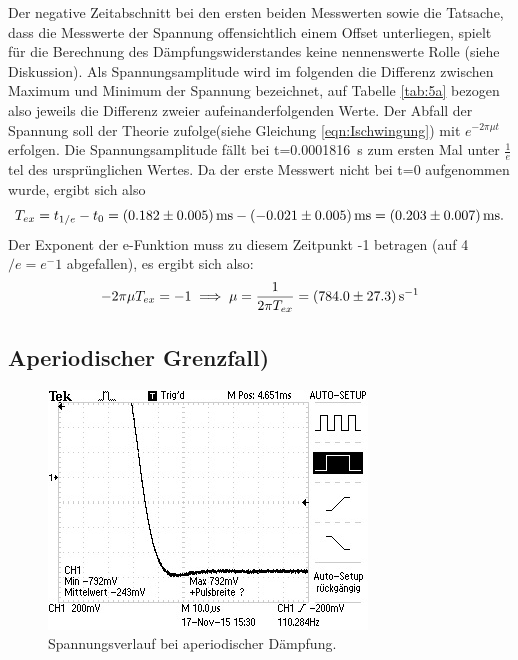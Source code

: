 Der negative Zeitabschnitt bei den ersten beiden Messwerten
sowie die Tatsache, dass
die Messwerte der Spannung
offensichtlich einem Offset unterliegen,
spielt für die Berechnung des Dämpfungswiderstandes keine nennenswerte Rolle
(siehe Diskussion).
Als Spannungsamplitude wird im folgenden die Differenz zwischen Maximum und
Minimum der Spannung bezeichnet, auf Tabelle
\ref{tab:5a} bezogen also jeweils die
Differenz zweier aufeinanderfolgenden Werte.
Der Abfall der Spannung soll der Theorie
zufolge(siehe Gleichung \ref{eqn:Ischwingung})
mit $e^{-2\pi\mu t}$ erfolgen. Die Spannungsamplitude fällt bei t=\SI{0.0001816}
{\second} zum ersten Mal unter
$\frac{1}{e}$tel des ursprünglichen Wertes.
Da der erste Messwert
nicht bei t=0 aufgenommen wurde, ergibt sich also
\begin{equation}
T_{ex} = t_{1/e} - t_0 = \SI{0.182 +- 0.005}{\milli\second}
- \SI{-0.021+-0.005}{\milli\second}=\SI{0.203 +- 0.007}{\milli\second}.
\end{equation}
Der Exponent der e-Funktion muss zu diesem Zeitpunkt -1 betragen (auf 4$/e=e^-1$
abgefallen), es ergibt sich also:
\begin{equation}
  -2\pi\mu T_{ex} = -1 \\
  \implies \mu = \frac{1}{2\pi T_{ex}} =  \SI{784.0 +- 27.3}{\per\second}
\end{equation}

\subsection{Aperiodischer Grenzfall)}
\begin{figure}
  \centering
  \includegraphics[width=\textwidth]{data/F0001TEK.jpg}
  \caption{Spannungsverlauf bei aperiodischer Dämpfung.}
  \label{fig:5bergebnis}
\end{figure}

